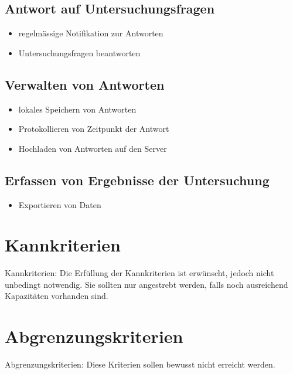 \documentclass[a4paper]{scrreprt}
\begin{document}
            \subsection{Antwort auf Untersuchungsfragen}
                \begin{itemize}
                    \item regelm\"assige Notifikation zur Antworten
                    \item Untersuchungsfragen beantworten
                \end{itemize}
                
            \subsection{Verwalten von Antworten}
                \begin{itemize}
                    \item lokales Speichern von Antworten
                    \item Protokollieren von Zeitpunkt der Antwort
                    \item Hochladen von Antworten auf den Server
                \end{itemize}
            
            \subsection{Erfassen von Ergebnisse der Untersuchung}
                \begin{itemize}
                    \item Exportieren von Daten  
                \end{itemize}
 
        \section{Kannkriterien}
            Kannkriterien: Die Erfüllung der Kannkriterien ist erwünscht, jedoch nicht
            unbedingt notwendig. Sie sollten nur angestrebt werden, falls noch ausreichend
            Kapazitäten vorhanden sind.
 
        \section{Abgrenzungskriterien}
            Abgrenzungskriterien: Diese Kriterien sollen bewusst nicht erreicht werden.
 
\end{document}
